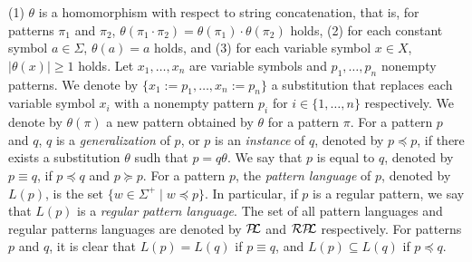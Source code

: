 (1) $\theta$ is a homomorphism with respect to string concatenation, that is, for patterns $\pi_{1}$ and $\pi_{2}$,
$\theta(\pi_{1} \cdot \pi_{2}) = \theta(\pi_{1}) \cdot \theta(\pi_{2})$ holds,
(2) for each constant symbol $a \in \Sigma$, $\theta(a) = a$ holds,
and (3) for each variable symbol $x \in X$, $|\theta(x)| \geq 1$ holds.
Let $x_{1},\ldots,x_{n}$ are variable symbols and $p_{1},\ldots,p_{n}$ nonempty patterns.
We denote by $\{x_{1}:=p_{1},\ldots,x_{n}:=p_{n}\}$ a substitution that replaces each variable symbol $x_{i}$
with a nonempty pattern $p_{i}$ for $i \in \{1,\ldots,n\}$ respectively.
We denote by $\theta(\pi)$ a new pattern obtained by $\theta$ for a pattern $\pi$.
%
For a pattern $p$ and $q$,
$q$ is a \textit{generalization} of $p$, or $p$ is an \textit{instance} of $q$, denoted by $p \preceq p$,
if there exists a substitution $\theta$ sudh that $p = q\theta$.
We say that $p$ is equal to $q$, denoted by $p \equiv q$, if $p \preceq q$ and $p \succeq p$.
%
%
For a pattern $p$, the \textit{pattern language} of $p$, denoted by $L(p)$, is the set $\{w \in \Sigma^{+} \mid w \preceq p\}$.
In particular, if $p$ is a regular pattern, we say that $L(p)$ is a \textit{regular pattern language}.
The set of all pattern languages and regular patterns languages are denoted by $\mathcal{P\!\!L}$ and $\mathcal{RP\!\!L}$ respectively.
For patterns $p$ and $q$, it is clear that $L(p) = L(q)$ if $p \equiv q$, and $L(p) \subseteq L(q)$ if $p \preceq q$.
